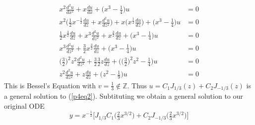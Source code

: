 \documentclass[12pt]{article}
\begin{document}
	\begin{align}
		x^2\frac{d^2u}{dx^2} + x\frac{du}{dx} + \big(x^3 - \tfrac{1}{4}\big)u & = 0 \nonumber \\
		x^2\Big( \frac{1}{2}x^{-\frac{1}{2}}\frac{du}{dz} + x\frac{d^2u}{dz^2} \Big) + x \Big( x^\frac{1}{2}\frac{du}{dz} \Big) + \big(x^3 - \tfrac{1}{4}\big)u & =  0 \nonumber  \\
		\tfrac{1}{2}x^{\frac{3}{2}}\frac{du}{dz} + x^3\frac{d^2u}{dz^2} + x^\frac{3}{2}\frac{du}{dz} + \big(x^3 - \tfrac{1}{4}\big)u & =  0 \nonumber  \\
		x^3\frac{d^2u}{dz^2} + \frac{3}{2}x^{\frac{3}{2}}\frac{du}{dz} + \big(x^3 - \tfrac{1}{4}\big)u & =  0 \nonumber  \\
		\big(\tfrac{3}{2}\big)^2z^2\frac{d^2u}{dz^2} + \tfrac{3}{2}\tfrac{3}{2}z\frac{du}{dz} + \Big(\big(\tfrac{3}{2}\big)^2z^2 - \tfrac{1}{4}\Big)u & =  0 \nonumber  \\
		z^2\frac{d^2u}{dz^2} + z\frac{du}{dz} + \big(z^2 - \tfrac{1}{9}\big)u & =  0 \label{p4eq2}
	\end{align}
	This is Bessel's Equation with $v=\frac{1}{3} \notin \mathbb{Z}$. Thus $u= C_1J_{1/3}(z) + C_2J_{-1/3}(z)$ is a general solution to (\ref{p4eq2}). Subtituting we obtain a general solution to our original ODE
	$$
	y= x^{-\frac{1}{2}} \Bigg[ J_{1/3} C_1 \Big(\tfrac{2}{3}x^{3/2}\Big) + C_2 J_{-1/3}\Big(\tfrac{2}{3}x^{3/2}\Big) \Bigg]
	$$
	
\end{document}
